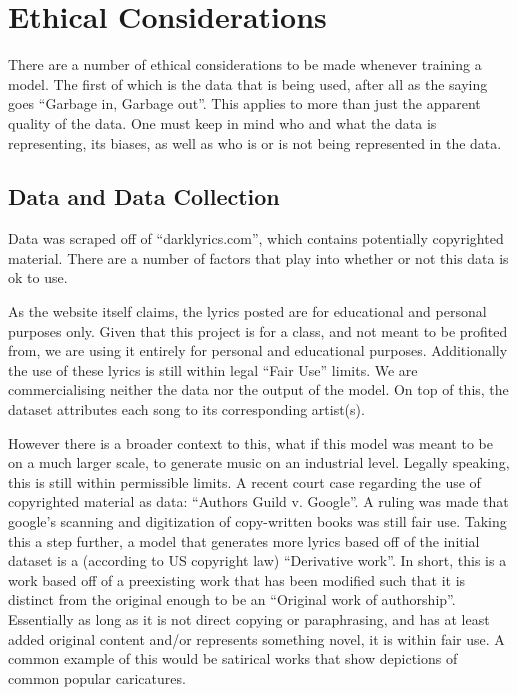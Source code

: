 \documentclass[11pt]{article}
\begin{document}
\section{Ethical Considerations}

There are a number of ethical considerations to be made whenever training a model. The first of which is the data that is being used, after all as the saying goes “Garbage in, Garbage out”. This applies to more than just the apparent quality of the data. One must keep in mind who and what the data is representing, its biases, as well as who is or is not being represented in the data.

\subsection{Data and Data Collection}

Data was scraped off of “darklyrics.com”, which contains potentially copyrighted material. There are a number of factors that play into whether or not this data is ok to use. 

As the website itself claims, the lyrics posted are for educational and personal purposes only. Given that this project is for a class, and not meant to be profited from, we are using it entirely for personal and educational purposes. Additionally the use of these lyrics is still within legal “Fair Use” limits. We are commercialising neither the data nor the output of the model. On top of this, the dataset attributes each song to its corresponding artist(s).

However there is a broader context to this, what if this model was meant to be on a much larger scale, to generate music on an industrial level. Legally speaking, this is still within permissible limits. A recent court case regarding the use of copyrighted material as data: “Authors Guild v. Google”. A ruling was made that google’s scanning and digitization of copy-written books was still fair use. Taking this a step further, a model that generates more lyrics based off of the initial dataset is a (according to US copyright law) “Derivative work”. In short, this is a work based off of a preexisting work that has been modified such that it is distinct from the original enough to be an “Original work of authorship”. Essentially as long as it is not direct copying or paraphrasing, and has at least added original content and/or represents something novel, it is within fair use. A common example of this would be satirical works that show depictions of common popular caricatures.
\end{document}
